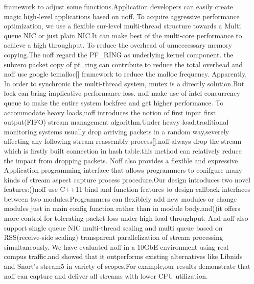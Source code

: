 \documentclass[conference]{IEEEtran}
\begin{document}
framework to adjust some functions.Application developers can easily create magic high-level applications based on noff.
\newline\indent To acquire aggressive performance optimization, we use a flexible sur-level multi-thread structure towards a  
Multi queue NIC or just plain NIC.It can make best of the multi-core performance to achieve a high throughput.
\newline\indent To reduce the overhead of unneccessary memory copying.The noff regard the PF\_RING as underlying kernel component. the subzero packet copy
of pf\_ring can contribute to reduce the total overhead and noff use google tcmalloc[] framework to reduce the malloc frequency.
\newline\indent Apparently, In order to synchronic the multi-thread system, mutex is a directly solution.But lock can bring implicative
performance loss. noff make use of intel concurrency queue to make the entire system lockfree and get higher performance.
\newline\indent To accommodate heavy loads,noff introduces the notion of first input first output(FIFO) stream management algorithm.Under heavy load,traditional
monitoring systems usually drop arriving packets in a random way,severely affecting any following stream reassembly process[].noff always
drop the stream which is firstly built connection in hash table.this method can relatively reduce the impact from dropping packets.
\newline\indent Noff also provides a flexible and expressive Application programming interface that allows programmers to conifgure many kinds of
stream aspect capture process procedure.Our design introduces two novel features:(\uppercase\expandafter{})noff use C++11 bind and function
features to design callback interfaces between two modules.Programmers can flexiblely add new modules or change modules just in main config
function rather than in module body.and(\uppercase\expandafter{})it offers more control for tolerating packet loss
under high load throughput. And noff also support single queue NIC multi-thread scaling and multi queue based on RSS(receive-side scaling)
transparent parallelization of stream processing simultaneously.
\newline\indent We have evaluated noff in a 10GbE environment using real compus traffic.and showed that it outperforms existing alternatives like Libnids
and Snort's stream5 in variety of scopes.For example,our results demonstrate that noff can capture and deliver all streams with lower CPU utilization.
\end{document}
